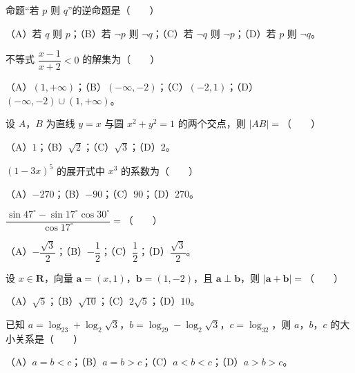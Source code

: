 

\begin{question}
命题“若 $p$ 则 $q$”的逆命题是\mbox{（　　）}

（A）若 $q$ 则 $p$；（B）若 $\neg p$ 则 $\neg q$；（C）若 $\neg q$ 则 $\neg p$；（D）若 $p$ 则 $\neg q$。

\end{question}
\begin{question}
不等式 $\dfrac{x-1}{x+2}<0$ 的解集为\mbox{（　　）}

（A）$(1,+\infty)$；（B）$(-\infty,-2)$；（C）$(-2,1)$；（D）$(-\infty,-2)\cup(1,+\infty)$。

\end{question}
\begin{question}
设 $A$，$B$ 为直线 $y=x$ 与圆 $x^2+y^2=1$ 的两个交点，则 $|AB|=$\mbox{（　　）}

（A）$1$；（B）$\sqrt2$；（C）$\sqrt3$；（D）$2$。

\end{question}
\begin{question}
$(1-3x)^5$ 的展开式中 $x^3$ 的系数为\mbox{（　　）}

（A）$-270$；（B）$-90$；（C）$90$；（D）$270$。

\end{question}
\begin{question}
$\dfrac{\sin47^\circ-\sin17^\circ\cos30^\circ}{\cos17^\circ}=$\mbox{（　　）}

（A）$-\dfrac{\sqrt3}2$；（B）$-\dfrac12$；（C）$\dfrac12$；（D）$\dfrac{\sqrt3}2$。

\end{question}
\begin{question}
设 $x\in\mathbf R$，向量 $\boldsymbol a=(x,1)$，$\boldsymbol b=(1,-2)$，且 $\boldsymbol a\perp\boldsymbol b$，则 $|\boldsymbol a+\boldsymbol b|=$\mbox{（　　）}

（A）$\sqrt5$；（B）$\sqrt{10}$；（C）$2\sqrt5$；（D）$10$。

\end{question}
\begin{question}
已知 $a=\log_23+\log_2\sqrt3$，$b=\log_29-\log_2\sqrt3$，$c=\log_32$，则 $a$，$b$，$c$ 的大小关系是\mbox{（　　）}

（A）$a=b<c$；（B）$a=b>c$；（C）$a<b<c$；（D）$a>b>c$。

\Needspace{0.4\textheight}
\end{question}
